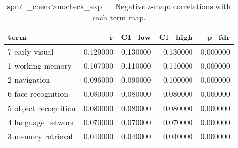 \begin{table}
\caption{spmT_check>nocheck_exp — Negative z-map: correlations with each term map.}
\label{tab:spmT_check>nocheck_exp_neg}
\begin{tabular}{lrrrr}
\toprule
term & r & CI\_low & CI\_high & p\_fdr \\
\midrule
7 early visual & 0.129000 & 0.130000 & 0.130000 & 0.000000 \\
1 working memory & 0.107000 & 0.110000 & 0.110000 & 0.000000 \\
2 navigation & 0.096000 & 0.090000 & 0.100000 & 0.000000 \\
6 face recognition & 0.080000 & 0.080000 & 0.080000 & 0.000000 \\
5 object recognition & 0.080000 & 0.080000 & 0.080000 & 0.000000 \\
4 language network & 0.070000 & 0.070000 & 0.070000 & 0.000000 \\
3 memory retrieval & 0.040000 & 0.040000 & 0.040000 & 0.000000 \\
\bottomrule
\end{tabular}
\end{table}
